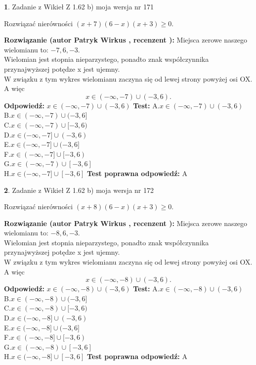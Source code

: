 \documentclass[12pt, a4paper]{article}
\theoremstyle{definition} %
\newtheorem{zad}{}
\newcommand{\zadStart}[1]{\begin{zad}#1\newline}
\newcommand{\zadStop}{\end{zad}}
\newcommand{\rozwStart}[2]{\noindent \textbf{Rozwiązanie (autor #1 , recenzent #2): }\newline}
\newcommand{\rozwStop}{\newline}
\newcommand{\odpStart}{\noindent \textbf{Odpowiedź:}\newline}
\newcommand{\odpStop}{\newline}
\newcommand{\testStart}{\noindent \textbf{Test:}\newline}
\newcommand{\testStop}{\newline}
\newcommand{\kluczStart}{\noindent \textbf{Test poprawna odpowiedź:}\newline}
\newcommand{\kluczStop}{\newline}
\begin{document}
\zadStart{Zadanie z Wikieł Z 1.62 b) moja wersja nr 171}

Rozwiązać nierówności $(x+7)(6-x)(x+3)\ge0$.
\zadStop
\rozwStart{Patryk Wirkus}{}
Miejsca zerowe naszego wielomianu to: $-7, 6, -3$.\\
Wielomian jest stopnia nieparzystego, ponadto znak współczynnika przy\linebreak najwyższej potędze x jest ujemny.\\ W związku z tym wykres wielomianu zaczyna się od lewej strony powyżej osi OX. A więc $$x \in (-\infty,-7) \cup (-3,6).$$
\rozwStop
\odpStart
$x \in (-\infty,-7) \cup (-3,6)$
\odpStop
\testStart
A.$x \in (-\infty,-7) \cup (-3,6)$\\
B.$x \in (-\infty,-7) \cup (-3,6]$\\
C.$x \in (-\infty,-7) \cup [-3,6)$\\
D.$x \in (-\infty,-7] \cup (-3,6)$\\
E.$x \in (-\infty,-7] \cup (-3,6]$\\
F.$x \in (-\infty,-7] \cup [-3,6)$\\
G.$x \in (-\infty,-7) \cup [-3,6]$\\
H.$x \in (-\infty,-7] \cup [-3,6]$
\testStop
\kluczStart
A
\kluczStop



\zadStart{Zadanie z Wikieł Z 1.62 b) moja wersja nr 172}

Rozwiązać nierówności $(x+8)(6-x)(x+3)\ge0$.
\zadStop
\rozwStart{Patryk Wirkus}{}
Miejsca zerowe naszego wielomianu to: $-8, 6, -3$.\\
Wielomian jest stopnia nieparzystego, ponadto znak współczynnika przy\linebreak najwyższej potędze x jest ujemny.\\ W związku z tym wykres wielomianu zaczyna się od lewej strony powyżej osi OX. A więc $$x \in (-\infty,-8) \cup (-3,6).$$
\rozwStop
\odpStart
$x \in (-\infty,-8) \cup (-3,6)$
\odpStop
\testStart
A.$x \in (-\infty,-8) \cup (-3,6)$\\
B.$x \in (-\infty,-8) \cup (-3,6]$\\
C.$x \in (-\infty,-8) \cup [-3,6)$\\
D.$x \in (-\infty,-8] \cup (-3,6)$\\
E.$x \in (-\infty,-8] \cup (-3,6]$\\
F.$x \in (-\infty,-8] \cup [-3,6)$\\
G.$x \in (-\infty,-8) \cup [-3,6]$\\
H.$x \in (-\infty,-8] \cup [-3,6]$
\testStop
\kluczStart
A
\kluczStop
\end{document}
